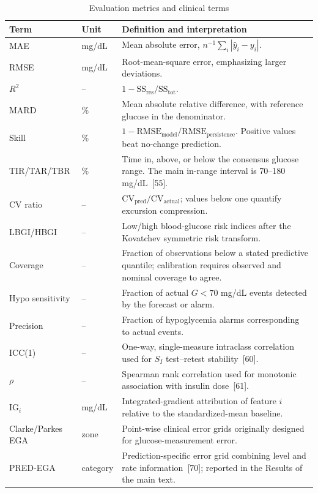 \documentclass[10pt]{article}
\begin{document}
\begin{table}[h!]
\centering
\caption{Evaluation metrics and clinical terms}
\label{tab:metrics}
\footnotesize
\begin{tabular}{llp{12.3cm}}
\toprule
Term & Unit & Definition and interpretation \\
\midrule
MAE & mg/dL & Mean absolute error, $n^{-1}\sum_i |\hat{y}_i - y_i|$. \\
RMSE & mg/dL & Root-mean-square error, emphasizing larger deviations. \\
$R^2$ & -- & $1 - \text{SS}_{\text{res}}/\text{SS}_{\text{tot}}$. \\
MARD & \% & Mean absolute relative difference, with reference glucose in the denominator. \\
Skill & \% & $1 - \text{RMSE}_{\text{model}}/\text{RMSE}_{\text{persistence}}$. Positive values beat no-change prediction. \\
TIR/TAR/TBR & \% & Time in, above, or below the consensus glucose range. The main in-range interval is 70--180 mg/dL~[55]. \\
CV ratio & -- & $\text{CV}_{\text{pred}}/\text{CV}_{\text{actual}}$; values below one quantify excursion compression. \\
LBGI/HBGI & -- & Low/high blood-glucose risk indices after the Kovatchev symmetric risk transform. \\
Coverage & -- & Fraction of observations below a stated predictive quantile; calibration requires observed and nominal coverage to agree. \\
Hypo sensitivity & -- & Fraction of actual $G<70$ mg/dL events detected by the forecast or alarm. \\
Precision & -- & Fraction of hypoglycemia alarms corresponding to actual events. \\
ICC(1) & -- & One-way, single-measure intraclass correlation used for $S_I$ test--retest stability~[60]. \\
$\rho$ & -- & Spearman rank correlation used for monotonic association with insulin dose~[61]. \\
$\text{IG}_i$ & mg/dL & Integrated-gradient attribution of feature $i$ relative to the standardized-mean baseline. \\
Clarke/Parkes EGA & zone & Point-wise clinical error grids originally designed for glucose-measurement error. \\
PRED-EGA & category & Prediction-specific error grid combining level and rate information~[70]; reported in the Results of the main text. \\
\bottomrule
\end{tabular}
\end{table}
\end{document}

